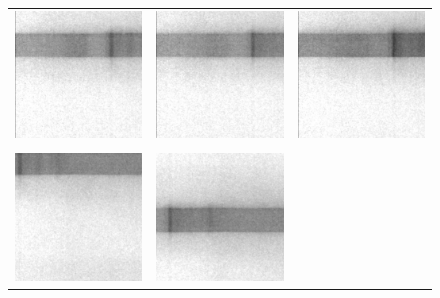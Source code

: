 \begin{figure}
  \begin{center}
  \begin{tabular}{ c c c }
  \includegraphics[width=.3\linewidth]{images/win_strategy/layer_21_grid} &
  \includegraphics[width=.3\linewidth]{images/win_strategy/layer_22_grid} &
  \includegraphics[width=.3\linewidth]{images/win_strategy/layer_23_grid} \\
   & & \\
  \includegraphics[width=.3\linewidth]{images/win_strategy/layer_21_rand} &
  \includegraphics[width=.3\linewidth]{images/win_strategy/layer_22_rand} &

\end{tabular}
\end{center}
\end{figure}
